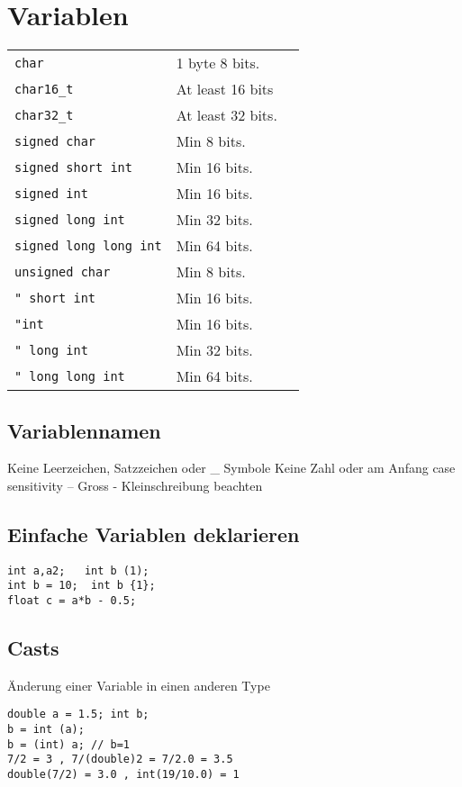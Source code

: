 \section{Variablen}

\begin{center}
	\begin{tabular}{ |l|l|l| } 
		\hline
		 \texttt{char} & 1 byte  8 bits. \\ 
		 \texttt{char16\_t} & At least 16 bits \\ 
		 \texttt{char32\_t} & At least 32 bits. \\ 
		\hline
		
		 \texttt{signed char} 			& Min 8 bits. \\ 
		 \texttt{signed short int} 	& Min 16 bits. \\ 
		 \texttt{signed int} 			& Min 16 bits. \\ 
		 \texttt{signed long int} 		& Min 32 bits. \\
		 \texttt{signed long long int} & Min 64 bits. \\
		\hline
		
 		
		 \texttt{unsigned char} 			& Min 8 bits. \\ 
		 \texttt{" short int} 		& Min 16 bits. \\ 
		 \texttt{"int} 			& Min 16 bits. \\ 
		 \texttt{" long int} 		& Min 32 bits. \\
		 \texttt{" long long int} 	& Min 64 bits. \\
		\hline
	\end{tabular}
\end{center}
\subsection{Variablennamen}
Keine Leerzeichen, Satzzeichen oder \_ Symbole Keine Zahl oder am Anfang case sensitivity – Gross - Kleinschreibung beachten

\subsection{Einfache Variablen deklarieren}
\begin{lstlisting}
int a,a2;   int b (1);
int b = 10;  int b {1};
float c = a*b - 0.5;
\end{lstlisting}
\subsection{Casts}
Änderung einer Variable in einen anderen Type
\begin{lstlisting}	
double a = 1.5; int b;
b = int (a);
b = (int) a; // b=1
7/2 = 3 , 7/(double)2 = 7/2.0 = 3.5
double(7/2) = 3.0 , int(19/10.0) = 1
\end{lstlisting}


